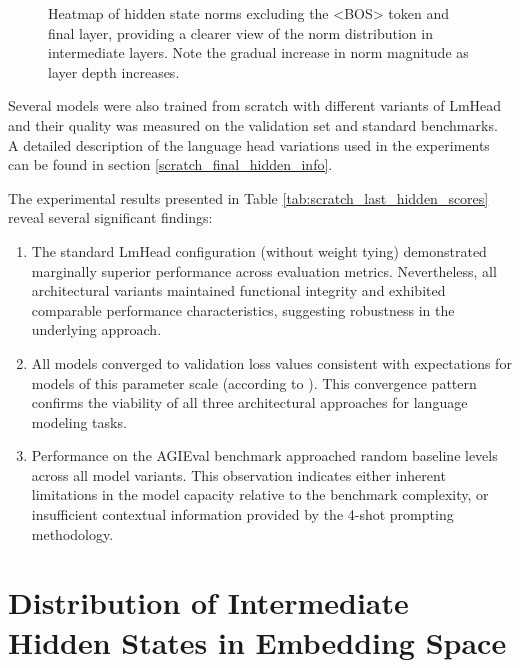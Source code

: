 \begin{figure}[t]
\begin{minipage}{0.48\textwidth}
        \caption{Heatmap of hidden state norms excluding the <BOS> token and final layer, providing a clearer view of the norm distribution in intermediate layers. Note the gradual increase in norm magnitude as layer depth increases.}
        \label{fig:heatmap_1b_notfull}
    \end{minipage}
\end{figure}


Several models were also trained from scratch with different variants of LmHead and their quality was measured on the validation set and standard benchmarks. A detailed description of the language head variations used in the experiments can be found in section \ref{scratch_final_hidden_info}.


The experimental results presented in Table \ref{tab:scratch_last_hidden_scores} reveal several significant findings:
\begin{enumerate}
    \item The standard LmHead configuration (without weight tying) demonstrated marginally superior performance across evaluation metrics. Nevertheless, all architectural variants maintained functional integrity and exhibited comparable performance characteristics, suggesting robustness in the underlying approach.
    \item All models converged to validation loss values consistent with expectations for models of this parameter scale (according to \cite{scaling_law}). This convergence pattern confirms the viability of all three architectural approaches for language modeling tasks.
    \item Performance on the AGIEval benchmark approached random baseline levels across all model variants. This observation indicates either inherent limitations in the model capacity relative to the benchmark complexity, or insufficient contextual information provided by the 4-shot prompting methodology.
\end{enumerate}

\section{Distribution of Intermediate Hidden States in Embedding Space}

